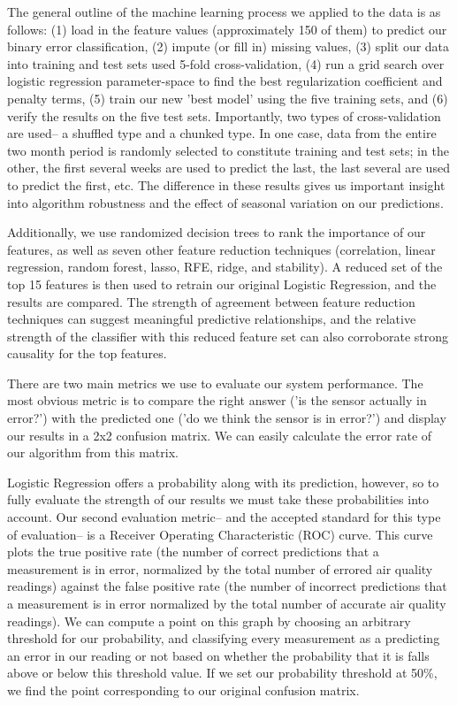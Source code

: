 The general outline of the machine learning process we applied to the data is as follows: (1) load in the feature values (approximately 150 of them) to predict our binary error classification, (2) impute (or fill in) missing values, (3) split our data into training and test sets used 5-fold cross-validation, (4) run a grid search over logistic regression parameter-space to find the best regularization coefficient and penalty terms, (5) train our new 'best model' using the five training sets, and (6) verify the results on the five test sets.  Importantly, two types of cross-validation are used-- a shuffled type and a chunked type.  In one case, data from the entire two month period is randomly selected to constitute training and test sets; in the other, the first several weeks are used to predict the last, the last several are used to predict the first, etc.  The difference in these results gives us important insight into algorithm robustness and the effect of seasonal variation on our predictions.  

Additionally, we use randomized decision trees to rank the importance of our features, as well as seven other feature reduction techniques (correlation, linear regression, random forest, lasso, RFE, ridge, and stability).  A reduced set of the top 15 features is then used to retrain our original Logistic Regression, and the results are compared.  The strength of agreement between feature reduction techniques can suggest meaningful predictive relationships, and the relative strength of the classifier with this reduced feature set can also corroborate strong causality for the top features.

There are two main metrics we use to evaluate our system performance.  The most obvious metric is to compare the right answer ('is the sensor actually in error?') with the predicted one ('do we think the sensor is in error?') and display our results in a 2x2 confusion matrix.  We can easily calculate the error rate of our algorithm from this matrix.

Logistic Regression offers a probability along with its prediction, however, so to fully evaluate the strength of our results we must take these probabilities into account.  Our second evaluation metric-- and the accepted standard for this type of evaluation-- is a Receiver Operating Characteristic (ROC) curve.  This curve plots the true positive rate (the number of correct predictions that a measurement is in error, normalized by the total number of errored air quality readings) against the false positive rate (the number of incorrect predictions that a measurement is in error normalized by the total number of accurate air quality readings).  We can compute a point on this graph by choosing an arbitrary threshold for our probability, and classifying every measurement as a predicting an error in our reading or not based on whether the probability that it is falls above or below this threshold value.  If we set our probability threshold at 50\%, we find the point corresponding to our original confusion matrix.

